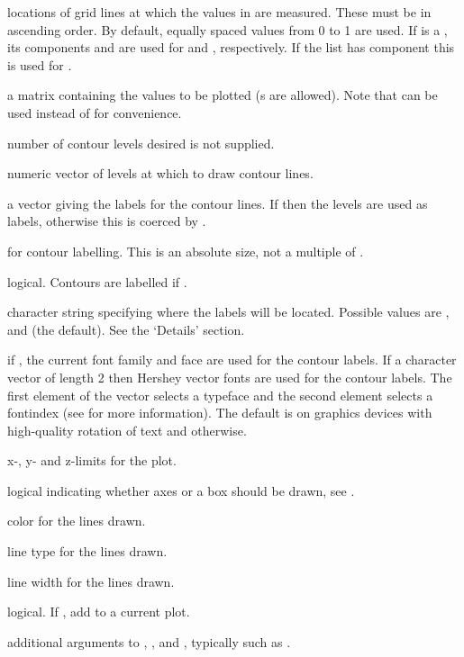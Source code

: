 \begin{Arguments}
\begin{ldescription}
\item[\code{x,y}] locations of grid lines at which the values in  are
measured.  These must be in ascending order.  By default, equally
spaced values from 0 to 1 are used.  If  is a ,
its components  and  are used for 
and , respectively. If the list has component  this
is used for .
\item[\code{z}] a matrix containing the values to be plotted (s are
allowed).  Note that  can be used instead of  for
convenience.
\item[\code{nlevels}] number of contour levels desired 
 is not supplied.
\item[\code{levels}] numeric vector of levels at which to draw contour
lines.
\item[\code{labels}] a vector giving the labels for the contour lines.  If
 then the levels are used as labels, otherwise this is
coerced by .
\item[\code{labcex}]  for contour labelling.  This is an absolute
size, not a multiple of .
\item[\code{drawlabels}] logical.  Contours are labelled if .
\item[\code{method}] character string specifying where the labels will be
located. Possible values are ,  and
 (the default).  See the `Details' section.
\item[\code{vfont}] if , the current font family and face are used
for the contour labels.  If a character vector of length 2 then
Hershey vector fonts are used for the contour labels. The first
element of the vector selects a typeface and the second element
selects a fontindex (see  for more information).
The default is  on graphics devices with high-quality
rotation of text and  otherwise.
\item[\code{xlim, ylim, zlim}] x-, y- and z-limits for the plot.
\item[\code{axes, frame.plot}] logical indicating whether axes or a box
should be drawn, see .
\item[\code{col}] color for the lines drawn.
\item[\code{lty}] line type for the lines drawn.
\item[\code{lwd}] line width for the lines drawn.
\item[\code{add}] logical. If , add to a current plot.
\item[\code{...}] additional arguments to ,
,  and ,
typically  such as .
\end{ldescription}
\end{Arguments}
